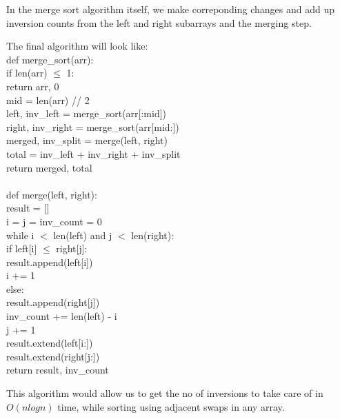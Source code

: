 \documentclass{article}[12pt]
\begin{document}
\begin{enumerate}
In the merge sort algorithm itself, we make correponding changes and add up inversion counts from the left and right subarrays and the merging step.

The final algorithm will look like:\\
def merge\_sort(arr):\\
\hspace*{2em}if len(arr) $\leq$ 1:\\
\hspace*{3em}return arr, 0\\
\hspace*{2em}mid = len(arr) // 2\\
\hspace*{2em}left, inv\_left = merge\_sort(arr[:mid])\\
\hspace*{2em}right, inv\_right = merge\_sort(arr[mid:])\\
\hspace*{2em}merged, inv\_split = merge(left, right)\\
\hspace*{2em}total = inv\_left + inv\_right + inv\_split\\
\hspace*{2em}return merged, total\\

\\
def merge(left, right):\\
\hspace*{2em}result = []\\
\hspace*{2em}i = j = inv\_count = 0\\
\hspace*{2em}while i $<$ len(left) and j $<$ len(right):\\
\hspace*{3em}if left[i] $\leq$ right[j]:\\
\hspace*{4em}result.append(left[i])\\
\hspace*{4em}i += 1\\
\hspace*{3em}else:\\
\hspace*{4em}result.append(right[j])\\
\hspace*{4em}inv\_count += len(left) - i\\
\hspace*{4em}j += 1\\
\hspace*{2em}result.extend(left[i:])\\
\hspace*{2em}result.extend(right[j:])\\
\hspace*{2em}return result, inv\_count

This algorithm would allow us to get the no of inversions to take care of in $O(nlogn)$ time, while sorting using adjacent swaps in any array.

\end{enumerate}
\end{document}
